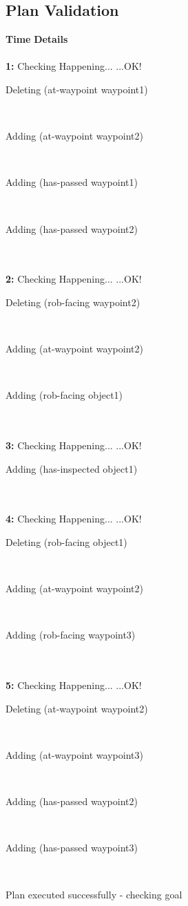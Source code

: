 \documentclass[a4paper,12pt]{article}
\newcommand{\headingtimedetails}{{\bf Time} \qquad \= {\bf Details}\\[0.8ex]}
\newcommand{\atime}[1]{{\bf #1:}}
\newcommand{\exprn}[1]{{\sf #1}}
\newcommand{\checkhappening}{Checking Happening... }
\newcommand{\listrow}[1]{\begin{minipage}[t]{11.5cm} #1 \end{minipage}}
\newcommand{\happeningOK}{...OK!}
\newcommand{\adding}[1]{\listrow{Adding \exprn{#1} }}
\newcommand{\deleting}[1]{\listrow{Deleting \exprn{#1} }}
\begin{document}
\subsection{Plan Validation}
\begin{tabbing}
\headingtimedetails 
\\
\atime{1} \> \checkhappening\happeningOK\\
 \> \deleting{(at-waypoint waypoint1)}\\
 \> \adding{(at-waypoint waypoint2)}\\
 \> \adding{(has-passed waypoint1)}\\
 \> \adding{(has-passed waypoint2)}\\
\\
\atime{2} \> \checkhappening\happeningOK\\
 \> \deleting{(rob-facing waypoint2)}\\
 \> \adding{(at-waypoint waypoint2)}\\
 \> \adding{(rob-facing object1)}\\
\\
\atime{3} \> \checkhappening\happeningOK\\
 \> \adding{(has-inspected object1)}\\
\\
\atime{4} \> \checkhappening\happeningOK\\
 \> \deleting{(rob-facing object1)}\\
 \> \adding{(at-waypoint waypoint2)}\\
 \> \adding{(rob-facing waypoint3)}\\
\\
\atime{5} \> \checkhappening\happeningOK\\
 \> \deleting{(at-waypoint waypoint2)}\\
 \> \adding{(at-waypoint waypoint3)}\\
 \> \adding{(has-passed waypoint2)}\\
 \> \adding{(has-passed waypoint3)}\\
\end{tabbing}
Plan executed successfully - checking goal\\
\\
\end{document}
